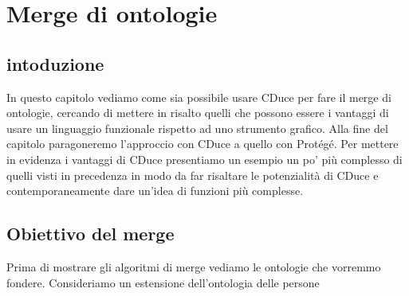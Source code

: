 \chapter{Merge di ontologie}
\section*{intoduzione}
In questo capitolo vediamo come sia possibile usare CDuce per fare il merge di ontologie, cercando di mettere in risalto quelli che possono essere i vantaggi di usare un linguaggio funzionale rispetto ad uno strumento grafico. Alla fine del capitolo paragoneremo l'approccio con CDuce a quello con Protégé. Per mettere in evidenza i vantaggi di CDuce presentiamo un esempio un po' più complesso di quelli visti in precedenza in modo da far risaltare le potenzialità di CDuce e contemporaneamente dare un'idea di funzioni più complesse.

\section{Obiettivo del merge}
Prima di mostrare gli algoritmi di merge vediamo le ontologie che vorremmo fondere. Consideriamo un estensione dell'ontologia delle persone 